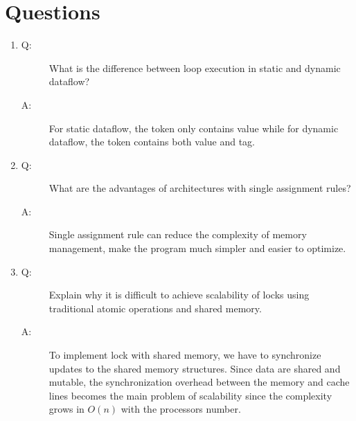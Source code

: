 \documentclass[12pt]{article}
\begin{document}
\section{Questions}
\begin{enumerate}
\item
\begin{description}
\item[Q: ] What is the difference between loop execution in static and 
dynamic dataflow?
\item[A: ] For static dataflow, the token only contains value while for 
dynamic dataflow, the token contains both value and tag.
\end{description}

\item
\begin{description}
\item[Q: ] What are the advantages of architectures with single 
assignment rules?
\item[A: ] Single assignment rule can reduce the complexity of memory
management, make the program much simpler and easier to optimize.
\end{description}

\item
\begin{description}
\item[Q: ] Explain why it is difficult to achieve scalability of 
locks using traditional atomic operations and shared memory.
\item[A: ] To implement lock with shared memory, we have to 
synchronize updates to the shared memory structures. Since data
are shared and mutable, the synchronization overhead between the 
memory and cache lines becomes the main problem of scalability since
the complexity grows in $O(n)$ with the processors number.

\end{description}

\end{enumerate}
\end{document}
